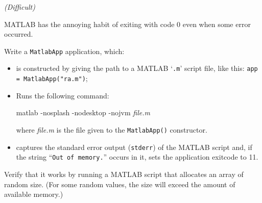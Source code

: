 \documentclass[english,serif,mathserif,xcolor=pdftex,dvipsnames,table]{beamer}
\begin{document}
\begin{frame}[fragile]
  \begin{exercise*}[2.F] \emph{(Difficult)} \small

    MATLAB has the annoying habit of exiting with code 0 even when some error occurred.

    \+
    Write a \texttt{MatlabApp} application, which:
    \begin{itemize}
    \item is constructed by giving the path to a MATLAB `\texttt{.m}'
      script file, like this: \texttt{app = MatlabApp("ra.m")};
    \item Runs the following command:
\begin{semiverbatim}
matlab -nosplash -nodesktop -nojvm \emph{file.m}
\end{semiverbatim}
      where \emph{file.m} is the file given to the
      \texttt{MatlabApp()} constructor.
    \item captures the standard error output (\texttt{stderr}) of the
      MATLAB script and, if the string ``\texttt{Out of memory.}''
      occurs in it, sets the application exitcode to 11.
    \end{itemize}

    Verify that it works by running a MATLAB script that allocates an
    array of random size. (For some random values, the size will
    exceed the amount of available memory.)
  \end{exercise*}
\end{frame}
\end{document}
